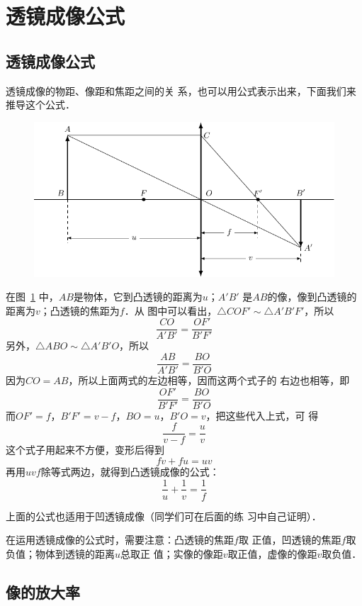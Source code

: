 \section{透镜成像公式}

\subsection{透镜成像公式}

透镜成像的物距、像距和焦距之间的关
系，也可以用公式表示出来，下面我们来推导这个公式．
\begin{figure}[htbp]
    \centering
    \includegraphics{fig/C/5-47.pdf}
    \caption{}\label{fig_C_5-47}
\end{figure}

在图~\ref{fig_C_5-47} 中，$AB$是物体，它到凸透镜的距离为$u$；$A'B'$
是$AB$的像，像到凸透镜的距离为$v$；凸透镜的焦距为$f$．从
图中可以看出，$\triangle COF'  \sim   \triangle A'B'F'$，所以
\[\frac{CO}{A'B'}=\frac{OF'}{B'F'}  \]
另外，$\triangle ABO \sim \triangle A'B'O$，所以
\[\frac{AB}{A'B'}=\frac{BO}{B'O} \]
因为$CO=AB$，所以上面两式的左边相等，因而这两个式子的
右边也相等，即
\[\frac{OF'}{B'F'}=\frac{BO}{B'O} \]
而$OF'=f$，$B'F'=v-f$，$BO=u$，$B'O=v$，把这些代入上式，可
得
\[\frac{f}{v-f}=\frac{u}{v} \]
这个式子用起来不方便，变形后得到
\[fv+fu=uv \]
再用$uvf$除等式两边，就得到凸透镜成像的公式：
\[\frac{1}{u}+\frac{1}{v}=\frac{1}{f}  \]

上面的公式也适用于凹透镜成像（同学们可在后面的练
习中自己证明）．

在运用透镜成像的公式时，需要注意：凸透镜的焦距$f$取
正值，凹透镜的焦距$f$取负值；物体到透镜的距离$u$总取正
值；实像的像距$v$取正值，虚像的像距$v$取负值．

\subsection{像的放大率}

